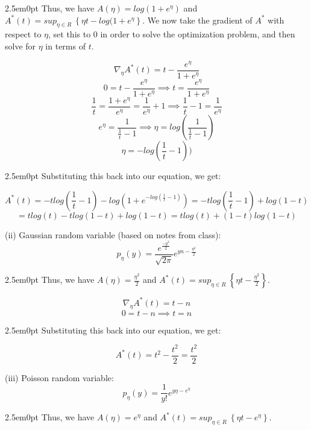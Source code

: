 \documentclass[11pt]{article}
\newenvironment{problem}[2][Problem]{\begin{trivlist}
\item[\hskip \labelsep {\bfseries #1}\hskip \labelsep {\bfseries #2.}]}{\end{trivlist}}
\begin{document}
\begin{problem}{2.2}
\begin{adjustwidth}{2.5em}{0pt}
Thus, we have $A(\eta) = log(1+e^{\eta})$ and $A^{*}(t) = sup_{\eta\in R}~ \left\{\eta t - log(1+e^{\eta}\right\}$. We now take the gradient of $A^{*}$ with respect to $\eta$, set this to 0 in order to solve the optimization problem, and then solve for $\eta$ in terms of $t$.
\end{adjustwidth}

\[\nabla_{\eta} A^{*}(t) = t - \frac{e^{\eta}}{1+e^{\eta}} \]
\[0  = t - \frac{e^{\eta}}{1+e^{\eta}} \implies t = \frac{e^{\eta}}{1+e^{\eta}} \]
\[ \frac{1}{t} = \frac{1+e^{\eta}}{e^{\eta}} = \frac{1}{e^{\eta}} + 1 \implies \frac{1}{t} - 1 = \frac{1}{e^{\eta}}\]
\[e^{\eta} = \frac{1}{\frac{1}{t} - 1} \implies \eta = log(\frac{1}{\frac{1}{t} - 1})\]
\[\eta = -log(\frac{1}{t} - 1))\]

\begin{adjustwidth}{2.5em}{0pt}
Substituting this back into our equation, we get:
\end{adjustwidth}

\[A^{*}(t) = -tlog(\frac{1}{t}-1) - log(1+e^{-log(\frac{1}{t}-1)}) = -tlog(\frac{1}{t}-1) + log(1-t)\]
\[= tlog(t) - tlog(1-t) + log(1-t) = tlog(t) + (1-t)log(1-t)\]

(ii) Gaussian random variable (based on notes from class):
\\
\[p_{\eta}(y) = \frac{e^{\frac{-y^{2}}{2}}}{\sqrt{2\pi}}e^{yn - \frac{\eta^2}{2}}\]

\begin{adjustwidth}{2.5em}{0pt}
Thus, we have $A(\eta) = \frac{\eta^2}{2}$ and $A^{*}(t) = sup_{\eta\in R}~ \left\{\eta t - \frac{\eta^2}{2}\right\}$. 
\end{adjustwidth}

\[\nabla_{\eta} A^{*}(t) = t - n \]
\[0 = t - n \implies t = n \]

\begin{adjustwidth}{2.5em}{0pt}
Substituting this back into our equation, we get:
\end{adjustwidth}
\[A^{*}(t) = t^2 - \frac{t^2}{2} = \frac{t^2}{2}\]

(iii) Poisson random variable: 
\\
\[p_{\eta}(y) = \frac{1}{y!}e^{y\eta - e^{\eta}} \]

\begin{adjustwidth}{2.5em}{0pt}
Thus, we have $A(\eta) = e^{\eta}$ and $A^{*}(t) = sup_{\eta\in R}~ \left\{\eta t - e^{\eta}\right\}$. 
\end{adjustwidth}


\end{problem}
\end{document}
